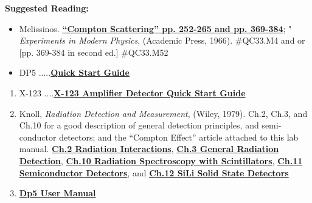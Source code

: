 \documentclass{../lab}
\begin{document}
\textbf{Suggested Reading:}

\begin{itemize}
    \item Melissinos. \href{http://physics111.lib.berkeley.edu/Physics111/Reprints/COM/Melissinos\%201966\%20pg\%20252-265\%20and\%20369-384.pdf}{\textbf{``Compton Scattering'' pp. 252-265 and pp. 369-384}}; " \emph{Experiments in Modern Physics}, (Academic Press, 1966). \#QC33.M4 and or [pp. 369-384 in second ed.] \#QC33.M52

    \item DP5 .....\href{http://experimentationlab.berkeley.edu/sites/default/files/images/DP5\_Quick\_Start-Guide\_B0.pdf}{\textbf{Quick Start Guide}}

\end{itemize}

\begin{enumerate}
    \item X-123 ....\href{http://experimentationlab.berkeley.edu/sites/default/files/images/X-123.pdf}{\textbf{X-123 Amplifier Detector Quick Start Guide}}

    \item Knoll, \emph{Radiation Detection and Measurement}, (Wiley, 1979). Ch.2, Ch.3, and Ch.10 for a good description of general detection principles, and semi-conductor detectors; and the ``Compton Effect'' article attached to this lab manual. \href{http://physics111.lib.berkeley.edu/Physics111/Reprints/COM/01-Radiation\_Detection\_and\_Measurement\_CH\_02.pdf}{\textbf{Ch.2 Radiation Interactions}}, \href{http://physics111.lib.berkeley.edu/Physics111/Reprints/COM/01-Radiation\_Detection\_and\_Measurement\_CH\_03.pdf}{\textbf{Ch.3 General Radiation Detection}},  \href{http://physics111.lib.berkeley.edu/Physics111/Reprints/COM/01-Radiation\_Detection\_and\_Measurement\_CH\_10.pdf}{\textbf{Ch.10 Radiation Spectroscopy with Scintillators}}, \href{http://physics111.lib.berkeley.edu/Physics111/Reprints/COM/01-Radiation\_Detection\_and\_Measurement\_CH\_11.pdf}{\textbf{Ch.11 Semiconductor Detectors}}, and \href{http://physics111.lib.berkeley.edu/Physics111/Reprints/COM/Knoll\_ch.\%2012\%20lithium-drifted\%20germanium\%20detectors.pdf}{\textbf{Ch.12 SiLi Solid State Detectors}}

    \item \href{http://experimentationlab.berkeley.edu/sites/default/files/images/DP5\_User\_Manual\_A1.pdf}{\textbf{Dp5 User Manual}}

\end{enumerate}
\end{document}
